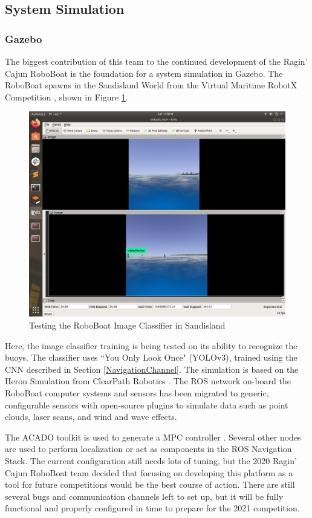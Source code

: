 \documentclass[letterpaper, 12 pt, conference]{ieeeconf}
\begin{document}
\subsection{System Simulation}
\subsubsection{Gazebo}
The biggest contribution of this team to the continued development of the Ragin' Cajun RoboBoat is the foundation for a system simulation in Gazebo. The RoboBoat spawns in the Sandisland World from the Virtual Maritime RobotX Competition \cite{Bingham:19a}, shown in Figure \ref{fig:YOLO}.
%
\begin{figure}[tb]
\centering
\vspace{0.05in}
\includegraphics[width=\columnwidth]{Figures/YOLOV3.png}
\caption{Testing the RoboBoat Image Classifier in Sandisland}
\label{fig:YOLO}
\end{figure}
%
Here, the image classifier training is being tested on its ability to recognize the buoys. The classifier uses ``You Only Look Once" (YOLOv3), trained using the CNN described in Section \ref{NavigationChannel}. The simulation is based on the Heron Simulation from ClearPath Robotics \cite{Bogdon:19a}. The ROS network on-board the RoboBoat computer systems and sensors has been migrated to generic, configurable sensors with open-source plugins to simulate data such as point clouds, laser scans, and wind and wave effects. 

The ACADO toolkit is used to generate a MPC controller \cite{Houska:11a}. Several other nodes are used to perform localization or act as components in the ROS Navigation Stack. The current configuration still needs lots of tuning, but the 2020 Ragin' Cajun RoboBoat team decided that focusing on developing this platform as a tool for future competitions would be the best course of action. There are still several bugs and communication channels left to set up, but it will be fully functional and properly configured in time to prepare for the 2021 competition.
\end{document}
